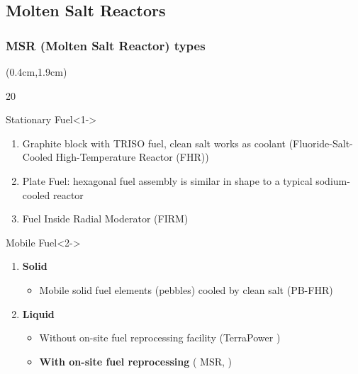 \subsection{Molten Salt Reactors}


\begin{frame}
\frametitle{MSR (Molten Salt Reactor) types}
\begin{textblock*}{12cm}(0.4cm,1.9cm) %
\begin{overlayarea}{\linewidth}{20\baselineskip}
\begin{block}{Stationary Fuel}<1->
	\begin{enumerate}
				\item Graphite block with TRISO fuel, clean salt works as 
				coolant (Fluoride-Salt-Cooled High-Temperature Reactor (FHR))
				\item Plate Fuel: hexagonal fuel assembly is similar in shape 
				to a typical sodium-cooled reactor
				\item Fuel Inside Radial Moderator (FIRM)
	\end{enumerate}
\end{block}

\begin{block}{Mobile Fuel}<2->
	\begin{enumerate}
		\item \textbf{Solid}
			\begin{itemize}
				\item<2-> Mobile solid fuel elements (pebbles) cooled by 
				clean salt (PB-FHR)
			\end{itemize}
			\item<3-> \textbf{Liquid}
			\begin{itemize}
				\item<3-> Without on-site fuel reprocessing facility 
				(TerraPower )
				\item<4-> \textbf{With on-site fuel reprocessing} 
				( MSR, )
			\end{itemize}
	\end{enumerate}
\end{block}
\end{overlayarea}
\end{textblock*}
\end{frame}


